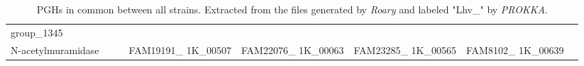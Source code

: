 \documentclass[10pt,a4paper]{article}
\begin{document}
\begin{landscape}
\begin{table}[h]
\begin{tabularx}{\linewidth}{|l|l|X|X|X|X|X|X|}
			group\_1345 & \begin{tabular}[c]{@{}l@{}}Lhv\_0190 \\N-acetylmuramidase \end{tabular} &  &  & FAM19191\_ 1K\_00507 & FAM22076\_ 1K\_00063 & FAM23285\_ 1K\_00565 & FAM8102\_ 1K\_00639 \\
			\hline
		\end{tabularx}
		\caption{PGHs in common between all strains. Extracted from the files generated by \textit{Roary} and labeled "Lhv\_" by \textit{PROKKA}.}
		\label{tab:resultCommonLhv}
	\end{table}
\end{landscape}
\end{document}
